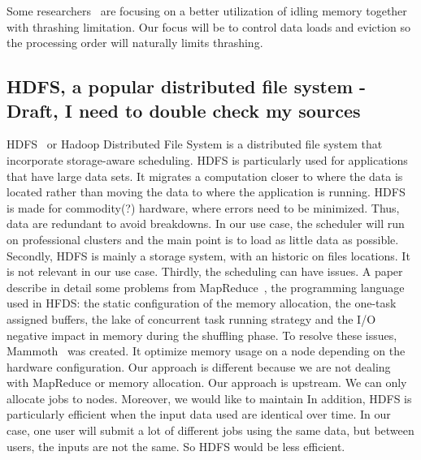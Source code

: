 \documentclass[conference,10pt]{IEEEtran}
\begin{document}
Some researchers~\cite{Nikolopoulos2003AdaptiveSU}
are focusing on a better utilization of idling memory together with 
thrashing limitation. Our focus will be to control data loads and eviction so the
processing order will naturally limits thrashing.

\subsection{HDFS, a popular distributed file system - Draft, I need to double check my sources}
HDFS~\cite{hdfs} or Hadoop Distributed File System is a distributed file system that
incorporate storage-aware scheduling. HDFS is particularly used for applications that have large data sets. 
It migrates a computation closer to where the data is located rather than moving the data to where
the application is running.
HDFS is made for commodity(?) hardware, where errors need to be minimized. Thus, data are redundant
to avoid breakdowns.
In our use case, the scheduler will run on professional clusters and the main point is to load as 
little data as possible. 
Secondly, HDFS is mainly a storage system, with an historic on files locations. 
It is not relevant in our use case. 
Thirdly, the scheduling can have issues. A paper describe in detail some problems from MapReduce~\cite{issue_with_hdfs}, the
programming language used in HFDS: the static configuration of the memory allocation, the one-task assigned buffers, the
lake of concurrent task running strategy and the I/O negative impact in memory during the shuffling phase.
To resolve these issues, Mammoth~\cite{Mammoth} was created. It optimize memory usage on a node depending on the hardware configuration.
Our approach is different because we are not dealing with MapReduce or memory allocation.
Our approach is upstream. We can only allocate jobs to nodes. Moreover, we would like to maintain
In addition, HDFS is particularly efficient when the input data used are identical over time.
In our case, one user will submit a lot of different jobs using the same data, but between users,
the inputs are not the same. So HDFS would be less efficient.
\end{document}
